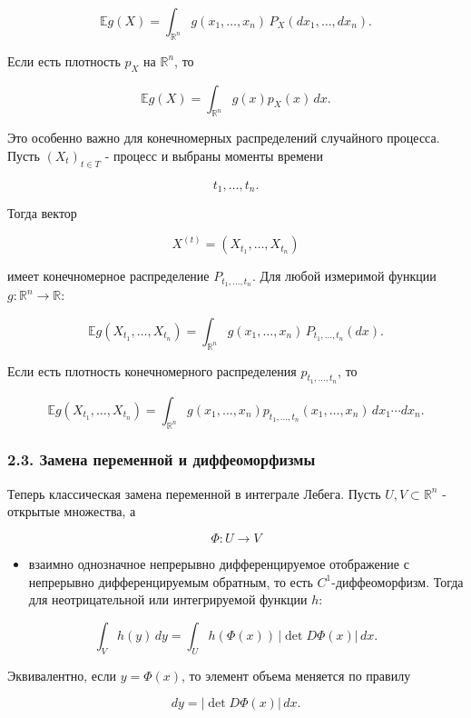 \documentclass[
  11pt,
  a4paper,
]{article}
\providecommand{\tightlist}{%
  \setlength{\itemsep}{0pt}\setlength{\parskip}{0pt}}
\begin{document}
\[
\mathbb E g(X)
=
\int_{\mathbb R^n}g(x_1,\ldots,x_n)\,P_X(dx_1,\ldots,dx_n).
\]

Если есть плотность \(p_X\) на \(\mathbb R^n\), то

\[
\mathbb E g(X)
=
\int_{\mathbb R^n}g(x)p_X(x)\,dx.
\]

Это особенно важно для конечномерных распределений случайного процесса.
Пусть \((X_t)_{t\in T}\) - процесс и выбраны моменты времени

\[
t_1,\ldots,t_n.
\]

Тогда вектор

\[
X^{(t)}=(X_{t_1},\ldots,X_{t_n})
\]

имеет конечномерное распределение \(P_{t_1,\ldots,t_n}\). Для любой
измеримой функции \(g:\mathbb R^n\to\mathbb R\):

\[
\mathbb E g(X_{t_1},\ldots,X_{t_n})
=
\int_{\mathbb R^n}g(x_1,\ldots,x_n)\,P_{t_1,\ldots,t_n}(dx).
\]

Если есть плотность конечномерного распределения \(p_{t_1,\ldots,t_n}\),
то

\[
\mathbb E g(X_{t_1},\ldots,X_{t_n})
=
\int_{\mathbb R^n}g(x_1,\ldots,x_n)
p_{t_1,\ldots,t_n}(x_1,\ldots,x_n)\,dx_1\cdots dx_n.
\]

\subsubsection{2.3. Замена переменной и
диффеоморфизмы}\label{ux437ux430ux43cux435ux43dux430-ux43fux435ux440ux435ux43cux435ux43dux43dux43eux439-ux438-ux434ux438ux444ux444ux435ux43eux43cux43eux440ux444ux438ux437ux43cux44b}

Теперь классическая замена переменной в интеграле Лебега. Пусть
\(U,V\subset\mathbb R^n\) - открытые множества, а

\[
\Phi:U\to V
\]

\begin{itemize}
\tightlist
\item
  взаимно однозначное непрерывно дифференцируемое отображение с
  непрерывно дифференцируемым обратным, то есть \(C^1\)-диффеоморфизм.
  Тогда для неотрицательной или интегрируемой функции \(h\):
\end{itemize}

\[
\int_V h(y)\,dy
=
\int_U h(\Phi(x))\,|\det D\Phi(x)|\,dx.
\]

Эквивалентно, если \(y=\Phi(x)\), то элемент объема меняется по правилу

\[
dy=|\det D\Phi(x)|\,dx.
\]
\end{document}
